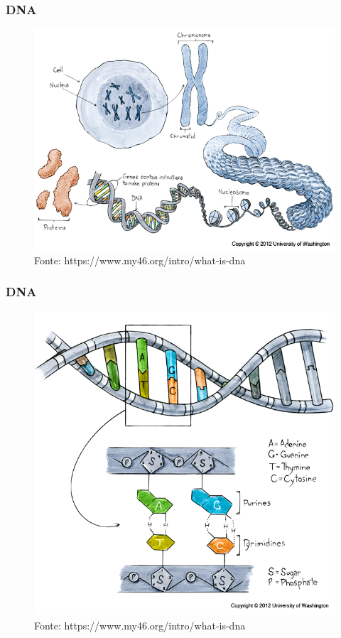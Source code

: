 \documentclass{beamer}
\begin{document}
		\begin{frame} \frametitle{DNA}
		\begin{figure}[hbtp]
			\centering
			\includegraphics[scale=0.42]{img/dna01.png}
			\caption{\tiny{Fonte: https://www.my46.org/intro/what-is-dna}}
		\end{figure}
		\end{frame}	
	
		\begin{frame} \frametitle{DNA}
		\begin{figure}[hbtp]
			\centering
			\includegraphics[scale=0.3]{img/dna02.png}
			\caption{\tiny{Fonte: https://www.my46.org/intro/what-is-dna}}
		\end{figure}
		\end{frame}	
	
\end{document}
